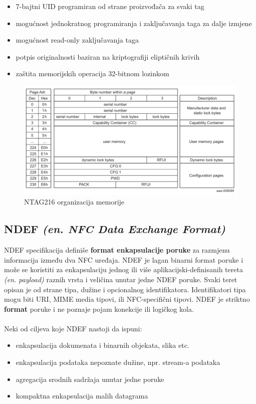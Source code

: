 \begin{itemize}[noitemsep]
    \item 7-bajtni UID programiran od strane proizvođača za svaki tag
    \item mogućnost jednokratnog programiranja i zaključavanja taga za dalje izmjene
    \item mogućnost read-only zaključavanja taga
    \item potpis originalnosti baziran na kriptografiji eliptičnih krivih
    \item zaštita memorijskih operacija 32-bitnom lozinkom
\end{itemize}

\begin{figure}[H]
    \centering
    \includegraphics[width=1\textwidth]{material/ntag216-memory}
    \caption{NTAG216 organizacija memorije\cite{NTAG216}}
\end{figure}

\subsection{NDEF \textit{(en. NFC Data Exchange Format)}}
NDEF specifikacija definiše \textbf{format enkapsulacije poruke} za razmjenu informacija između dva NFC uređaja. NDEF je lagan binarni format poruke i može se koristiti za enkapsulaciju jednog ili više aplikacijski-definisanih tereta \textit{(en. payload)} raznih vrsta i veličina unutar jedne NDEF poruke. Svaki teret opisan je od strane tipa, dužine i opcionalnog identifikatora. Identifikatori tipa mogu biti URI, MIME media tipovi, ili NFC-specifični tipovi. NDEF je striktno \textbf{format} poruke i ne poznaje pojam konekcije ili logičkog kola.\cite{NDEF}

\paragraph*{}
Neki od ciljeva koje NDEF nastoji da ispuni:
\begin{itemize}[noitemsep]
    \item enkapsulacija dokumenata i binarnih objekata, slika etc.
    \item enkapsulacija podataka nepoznate dužine, npr. stream-a podataka
    \item agregacija srodnih sadržaja unutar jedne poruke
    \item kompaktna enkapsulacija malih datagrama
\end{itemize}

